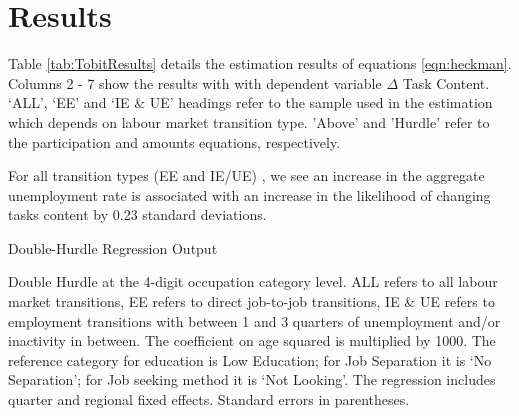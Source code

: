 \documentclass[12pt,authoryear]{elsarticle}
\begin{document}
	\section{Results}
	\label{sec:results}
	
	
Table \ref{tab:TobitResults} details the estimation results of equations \ref{eqn:heckman}. Columns 2 - 7 show the results with with dependent variable $\Delta$ Task Content. `ALL', `EE' and `IE \& UE' headings refer to the sample used in the estimation which depends on labour market transition type. 'Above' and 'Hurdle' refer to the participation and amounts equations, respectively.


 For all transition types (EE and IE/UE) , we see an increase in the aggregate unemployment rate is associated with an increase in the likelihood of changing tasks content by 0.23 standard deviations.
	
		\newpage
	\thispagestyle{empty}
	\begin{table}[htbp]
		\centering
		\caption{Double-Hurdle Regression Output}\label{tab:TobitResults}
		\begin{adjustbox}{width=\textwidth}
			\begin{threeparttable}
				
				
				\begin{tablenotes}
					\item{\footnotesize{Double Hurdle at the 4-digit occupation category level. ALL refers to all labour market transitions, EE refers to direct job-to-job transitions, IE \& UE refers to employment transitions with between 1 and 3 quarters of unemployment and/or inactivity in between. The coefficient on age squared is multiplied by 1000. The reference category for education is Low Education; for Job Separation it is `No Separation';  for Job seeking method it is `Not Looking'. The regression includes quarter and regional fixed effects. Standard errors in parentheses.}}
				\end{tablenotes}
			\end{threeparttable}
		\end{adjustbox}
	\end{table}
	\restoregeometry %

	
	
\end{document}
